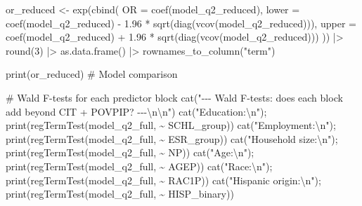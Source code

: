 \documentclass[
  letterpaper,
  DIV=11,
  numbers=noendperiod]{scrartcl}
\newenvironment{Shaded}{\begin{snugshade}}{\end{snugshade}}
\newcommand{\AttributeTok}[1]{\textcolor[rgb]{0.40,0.45,0.13}{#1}}
\newcommand{\CommentTok}[1]{\textcolor[rgb]{0.37,0.37,0.37}{#1}}
\newcommand{\DecValTok}[1]{\textcolor[rgb]{0.68,0.00,0.00}{#1}}
\newcommand{\FloatTok}[1]{\textcolor[rgb]{0.68,0.00,0.00}{#1}}
\newcommand{\FunctionTok}[1]{\textcolor[rgb]{0.28,0.35,0.67}{#1}}
\newcommand{\NormalTok}[1]{\textcolor[rgb]{0.00,0.23,0.31}{#1}}
\newcommand{\OtherTok}[1]{\textcolor[rgb]{0.00,0.23,0.31}{#1}}
\newcommand{\SpecialCharTok}[1]{\textcolor[rgb]{0.37,0.37,0.37}{#1}}
\newcommand{\StringTok}[1]{\textcolor[rgb]{0.13,0.47,0.30}{#1}}
\begin{document}
\begin{Shaded}
\begin{Highlighting}[]
\NormalTok{or\_reduced }\OtherTok{\textless{}{-}} \FunctionTok{exp}\NormalTok{(}\FunctionTok{cbind}\NormalTok{(}
  \AttributeTok{OR    =} \FunctionTok{coef}\NormalTok{(model\_q2\_reduced),}
  \AttributeTok{lower =} \FunctionTok{coef}\NormalTok{(model\_q2\_reduced) }\SpecialCharTok{{-}} \FloatTok{1.96} \SpecialCharTok{*} \FunctionTok{sqrt}\NormalTok{(}\FunctionTok{diag}\NormalTok{(}\FunctionTok{vcov}\NormalTok{(model\_q2\_reduced))),}
  \AttributeTok{upper =} \FunctionTok{coef}\NormalTok{(model\_q2\_reduced) }\SpecialCharTok{+} \FloatTok{1.96} \SpecialCharTok{*} \FunctionTok{sqrt}\NormalTok{(}\FunctionTok{diag}\NormalTok{(}\FunctionTok{vcov}\NormalTok{(model\_q2\_reduced)))}
\NormalTok{)) }\SpecialCharTok{|\textgreater{}}
  \FunctionTok{round}\NormalTok{(}\DecValTok{3}\NormalTok{) }\SpecialCharTok{|\textgreater{}}
  \FunctionTok{as.data.frame}\NormalTok{() }\SpecialCharTok{|\textgreater{}}
  \FunctionTok{rownames\_to\_column}\NormalTok{(}\StringTok{"term"}\NormalTok{)}

\FunctionTok{print}\NormalTok{(or\_reduced)}
\CommentTok{\# Model comparison}

\CommentTok{\# Wald F{-}tests for each predictor block}
\FunctionTok{cat}\NormalTok{(}\StringTok{"{-}{-}{-} Wald F{-}tests: does each block add beyond CIT + POVPIP? {-}{-}{-}}\SpecialCharTok{\textbackslash{}n\textbackslash{}n}\StringTok{"}\NormalTok{)}
\FunctionTok{cat}\NormalTok{(}\StringTok{"Education:}\SpecialCharTok{\textbackslash{}n}\StringTok{"}\NormalTok{);        }\FunctionTok{print}\NormalTok{(}\FunctionTok{regTermTest}\NormalTok{(model\_q2\_full, }\SpecialCharTok{\textasciitilde{}}\NormalTok{ SCHL\_group))}
\FunctionTok{cat}\NormalTok{(}\StringTok{"Employment:}\SpecialCharTok{\textbackslash{}n}\StringTok{"}\NormalTok{);       }\FunctionTok{print}\NormalTok{(}\FunctionTok{regTermTest}\NormalTok{(model\_q2\_full, }\SpecialCharTok{\textasciitilde{}}\NormalTok{ ESR\_group))}
\FunctionTok{cat}\NormalTok{(}\StringTok{"Household size:}\SpecialCharTok{\textbackslash{}n}\StringTok{"}\NormalTok{);   }\FunctionTok{print}\NormalTok{(}\FunctionTok{regTermTest}\NormalTok{(model\_q2\_full, }\SpecialCharTok{\textasciitilde{}}\NormalTok{ NP))}
\FunctionTok{cat}\NormalTok{(}\StringTok{"Age:}\SpecialCharTok{\textbackslash{}n}\StringTok{"}\NormalTok{);              }\FunctionTok{print}\NormalTok{(}\FunctionTok{regTermTest}\NormalTok{(model\_q2\_full, }\SpecialCharTok{\textasciitilde{}}\NormalTok{ AGEP))}
\FunctionTok{cat}\NormalTok{(}\StringTok{"Race:}\SpecialCharTok{\textbackslash{}n}\StringTok{"}\NormalTok{);             }\FunctionTok{print}\NormalTok{(}\FunctionTok{regTermTest}\NormalTok{(model\_q2\_full, }\SpecialCharTok{\textasciitilde{}}\NormalTok{ RAC1P))}
\FunctionTok{cat}\NormalTok{(}\StringTok{"Hispanic origin:}\SpecialCharTok{\textbackslash{}n}\StringTok{"}\NormalTok{);  }\FunctionTok{print}\NormalTok{(}\FunctionTok{regTermTest}\NormalTok{(model\_q2\_full, }\SpecialCharTok{\textasciitilde{}}\NormalTok{ HISP\_binary))}


\end{Highlighting}
\end{Shaded}
\end{document}
